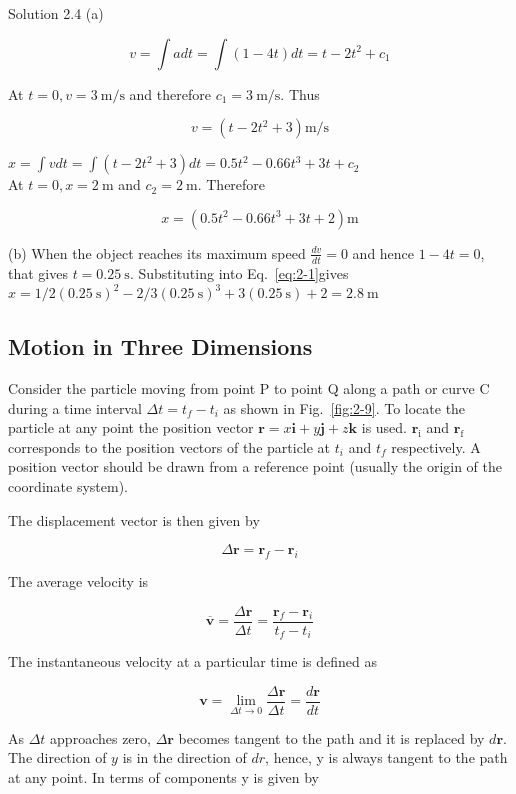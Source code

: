 \documentclass[10pt]{article}
\numberwithin{equation}{section}
\begin{document}
Solution 2.4 (a)

$$
v=\int a d t=\int(1-4 t) d t=t-2 t^{2}+c_{1}
$$

At $t=0, v=3 \mathrm{~m} / \mathrm{s}$ and therefore $c_{1}=3 \mathrm{~m} / \mathrm{s}$. Thus

$$
v=\left(t-2 t^{2}+3\right) \mathrm{m} / \mathrm{s}
$$

$x=\int v d t=\int\left(t-2 t^{2}+3\right) d t=0.5 t^{2}-0.66 t^{3}+3 t+c_{2}$\\
At $t=0, x=2 \mathrm{~m}$ and $c_{2}=2 \mathrm{~m}$. Therefore


\begin{equation}
x=\left(0.5 t^{2}-0.66 t^{3}+3 t+2\right) \mathrm{m} \label{eq:2-1}
\end{equation}


(b) When the object reaches its maximum speed $\frac{d v}{d t}=0$ and hence $1-4 t=0$, that gives $t=0.25 \mathrm{~s}$. Substituting into Eq.~\eqref{eq:2-1}gives\\
$x=1 / 2(0.25 \mathrm{~s})^{2}-2 / 3(0.25 \mathrm{~s})^{3}+3(0.25 \mathrm{~s})+2=2.8 \mathrm{~m}$

\subsection{Motion in Three Dimensions}\label{sec:2-3}
Consider the particle moving from point P to point Q along a path or curve C during a time interval $\Delta t=t_{f}-t_{i}$ as shown in Fig.~\ref{fig:2-9}. To locate the particle at any point the position vector $\mathbf{r}=x \mathbf{i}+y \mathbf{j}+z \mathbf{k}$ is used. $\mathbf{r}_{\mathrm{i}}$ and $\mathbf{r}_{\mathrm{f}}$ corresponds to the position vectors of the particle at $t_{i}$ and $t_{f}$ respectively. A position vector should be drawn from a reference point (usually the origin of the coordinate system).

The displacement vector is then given by

$$
\Delta \mathbf{r}=\mathbf{r}_{f}-\mathbf{r}_{i}
$$

The average velocity is

$$
\overline{\mathbf{v}}=\frac{\Delta \mathbf{r}}{\Delta t}=\frac{\mathbf{r}_{f}-\mathbf{r}_{i}}{t_{f}-t_{i}}
$$

The instantaneous velocity at a particular time is defined as

$$
\mathbf{v}=\lim _{\Delta t \rightarrow 0} \frac{\Delta \mathbf{r}}{\Delta t}=\frac{d \mathbf{r}}{d t}
$$

As $\Delta t$ approaches zero, $\Delta \mathbf{r}$ becomes tangent to the path and it is replaced by $d \mathbf{r}$. The direction of $y$ is in the direction of $d r$, hence, y is always tangent to the path at any point. In terms of components y is given by
\end{document}
